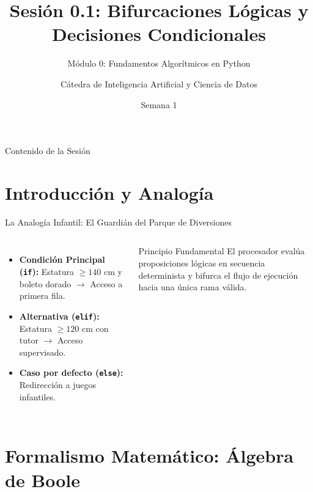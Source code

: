 \documentclass[aspectratio=169]{beamer}
\title[INT210 - Sesión 0.1]{Sesión 0.1: Bifurcaciones Lógicas y Decisiones Condicionales}
\subtitle{Módulo 0: Fundamentos Algorítmicos en Python}
\author[Diplomado en Ciencia de Datos]{Cátedra de Inteligencia Artificial y Ciencia de Datos}
\institute[INT210]{Machine Learning From Scratch}
\date{Semana 1}
\begin{document}
\frame{\titlepage}

\begin{frame}{Contenido de la Sesión}
    \tableofcontents
\end{frame}

\section{Introducción y Analogía}

\begin{frame}{La Analogía Infantil: El Guardián del Parque de Diversiones}
    \begin{columns}
        \begin{itemize}
            \item \textbf{Condición Principal (\texttt{if}):} Estatura $\ge 140$ cm y boleto dorado $\rightarrow$ Acceso a primera fila.
            \item \textbf{Alternativa (\texttt{elif}):} Estatura $\ge 120$ cm con tutor $\rightarrow$ Acceso supervisado.
            \item \textbf{Caso por defecto (\texttt{else}):} Redirección a juegos infantiles.
        \end{itemize}
        \begin{alertblock}{Principio Fundamental}
            El procesador evalúa proposiciones lógicas en secuencia determinista y bifurca el flujo de ejecución hacia una única rama válida.
        \end{alertblock}
    \end{columns}
\end{frame}

\section{Formalismo Matemático: Álgebra de Boole}
\end{document}
